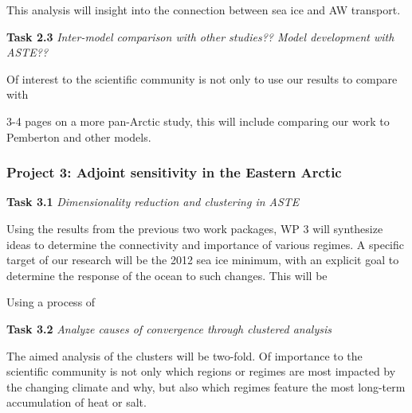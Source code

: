 \documentclass[a4paper,12pt]{article}
\begin{document}
    This analysis will insight into the connection between sea ice and AW transport.

    
    \begin{tcolorbox}[minipage,colback=columbiablue,arc=10pt,outer arc=10pt]
    \centering
    \textbf{Task 2.3}	\emph{Inter-model comparison with other studies?? Model development with ASTE??}\label{sec2_3}
    \end{tcolorbox}
    Of interest to the scientific community is not only to use our results to compare with 
    
    3-4 pages on a more pan-Arctic study, this will include comparing our work to Pemberton and other models.

    \subsubsection{Project 3: Adjoint sensitivity in the Eastern Arctic}

    \begin{tcolorbox}[minipage,colback=mossgreen,arc=10pt,outer arc=10pt]
    \centering
    \textbf{Task 3.1} \emph{Dimensionality reduction and clustering in ASTE}
    \end{tcolorbox}\label{sec3_1}


    Using the results from the previous two work packages, WP 3 will synthesize ideas to determine the connectivity and importance of various regimes. A specific target of our research will be the 2012 sea ice minimum, with an explicit goal to determine the response of the ocean to such changes. This will be 

    Using a process of 

    \begin{tcolorbox}[minipage,colback=mossgreen,arc=10pt,outer arc=10pt]
    \centering
    \textbf{Task 3.2} \emph{Analyze causes of convergence through clustered analysis}\label{sec3_2}
    \end{tcolorbox}

    The aimed analysis of the clusters will be two-fold. Of importance to the scientific community is not only which regions or regimes are most impacted by the changing climate and why, but also which regimes feature the most long-term accumulation of heat or salt.
\end{document}

